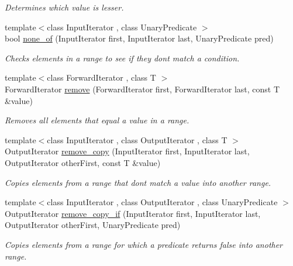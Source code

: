 \begin{DoxyCompactItemize}
\begin{DoxyCompactList}\small\item\em Determines which value is lesser. \end{DoxyCompactList}\item 
{\footnotesize template$<$class Input\+Iterator , class Unary\+Predicate $>$ }\\bool \hyperlink{namespaceprism_a3c43dafd5926d3dc6ce698ae8938810d}{none\+\_\+of} (Input\+Iterator first, Input\+Iterator last, Unary\+Predicate pred)
\begin{DoxyCompactList}\small\item\em Checks elements in a range to see if they don\textquotesingle{}t match a condition. \end{DoxyCompactList}\item 
{\footnotesize template$<$class Forward\+Iterator , class T $>$ }\\Forward\+Iterator \hyperlink{namespaceprism_aeddd21943bcf811c56f7d9d1bd4784f6}{remove} (Forward\+Iterator first, Forward\+Iterator last, const T \&value)
\begin{DoxyCompactList}\small\item\em Removes all elements that equal a value in a range. \end{DoxyCompactList}\item 
{\footnotesize template$<$class Input\+Iterator , class Output\+Iterator , class T $>$ }\\Output\+Iterator \hyperlink{namespaceprism_ab7b6fb407340e51749169560b48fb20c}{remove\+\_\+copy} (Input\+Iterator first, Input\+Iterator last, Output\+Iterator other\+First, const T \&value)
\begin{DoxyCompactList}\small\item\em Copies elements from a range that don\textquotesingle{}t match a value into another range. \end{DoxyCompactList}\item 
{\footnotesize template$<$class Input\+Iterator , class Output\+Iterator , class Unary\+Predicate $>$ }\\Output\+Iterator \hyperlink{namespaceprism_abfc7da1f951e480a26d58fc098b78844}{remove\+\_\+copy\+\_\+if} (Input\+Iterator first, Input\+Iterator last, Output\+Iterator other\+First, Unary\+Predicate pred)
\begin{DoxyCompactList}\small\item\em Copies elements from a range for which a predicate returns false into another range. \end{DoxyCompactList}\item 

\end{DoxyCompactItemize}

